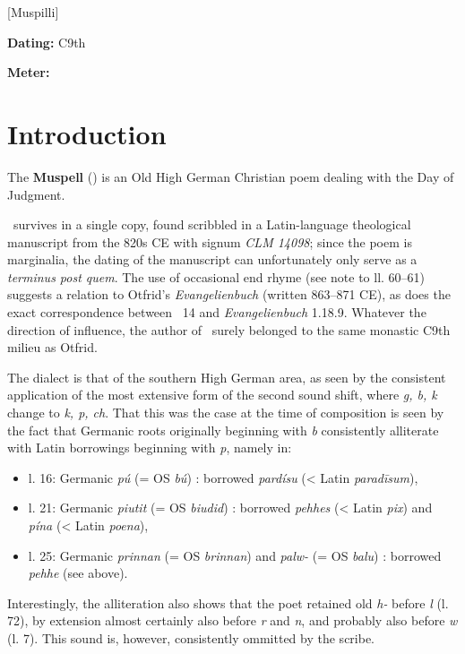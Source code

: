 [Muspilli]
\def\thisBookCode{Muspilli}

\begin{flushright}%
\textbf{Dating:} C9th

\textbf{Meter:} \Fornyrdislag%
\end{flushright}%

\section{Introduction}

The \textbf{Muspell} (\Muspilli) is an Old High German Christian poem dealing with the Day of Judgment.

\Muspilli\ survives in a single copy, found scribbled in a Latin-language theological manuscript from the 820s CE with signum \emph{CLM 14098}; since the poem is marginalia, the dating of the manuscript can unfortunately only serve as a \emph{terminus post quem}.  The use of occasional end rhyme (see note to ll. 60–61) suggests a relation to Otfrid’s \emph{Evangelienbuch} (written 863–871 CE), as does the exact correspondence between \Muspilli\ 14 and \emph{Evangelienbuch} 1.18.9.  Whatever the direction of influence, the author of \Muspilli\ surely belonged to the same monastic C9th milieu as Otfrid.

The dialect is that of the southern High German area, as seen by the consistent application of the most extensive form of the second sound shift, where \emph{g, b, k} change to \emph{k, p, ch}.  That this was the case at the time of composition is seen by the fact that Germanic roots originally beginning with \emph{b} consistently alliterate with Latin borrowings beginning with \emph{p}, namely in:

\begin{itemize}
  \item l. 16: Germanic \emph{pú} (= OS \emph{bú}) : borrowed \emph{pardísu} (< Latin \emph{paradīsum}),
  \item l. 21: Germanic \emph{piutit} (= OS \emph{biudid}) : borrowed \emph{pehhes} (< Latin \emph{pix}) and \emph{pína} (< Latin \emph{poena}),
  \item l. 25: Germanic \emph{prinnan} (= OS \emph{brinnan}) and \emph{palw-} (= OS \emph{balu}) : borrowed \emph{pehhe} (see above).
\end{itemize}

Interestingly, the alliteration also shows that the poet retained old \emph{h-} before \emph{l} (l. 72), by extension almost certainly also before \emph{r} and \emph{n}, and probably also before \emph{w} (l. 7).  This sound is, however, consistently ommitted by the scribe.

